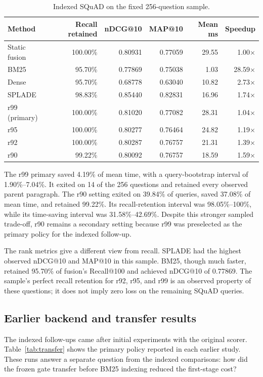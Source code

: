 \documentclass[conference]{IEEEtran}
\begin{document}
\begin{table}[t]
\centering
\caption{Indexed SQuAD on the fixed 256-question sample.}
\label{tab:squad}
\small
\begin{tabular}{lrrrrr}
\toprule
Method & Recall retained & nDCG@10 & MAP@10 & Mean ms & Speedup\\
\midrule
Static fusion & 100.00\% & 0.80931 & 0.77059 & 29.55 & 1.00$\times$\\
BM25 & 95.70\% & 0.77869 & 0.75038 & 1.03 & 28.59$\times$\\
Dense & 95.70\% & 0.68778 & 0.63040 & 10.82 & 2.73$\times$\\
SPLADE & 98.83\% & 0.85440 & 0.82831 & 16.96 & 1.74$\times$\\
r99 (primary) & 100.00\% & 0.81020 & 0.77082 & 28.31 & 1.04$\times$\\
r95 & 100.00\% & 0.80277 & 0.76464 & 24.82 & 1.19$\times$\\
r92 & 100.00\% & 0.80287 & 0.76757 & 21.31 & 1.39$\times$\\
r90 & 99.22\% & 0.80092 & 0.76757 & 18.59 & 1.59$\times$\\
\bottomrule
\end{tabular}
\end{table}

The r99 primary saved 4.19\% of mean time, with a query-bootstrap interval of 1.90\%--7.04\%. It exited on 14 of the 256 questions and retained every observed parent paragraph. The r90 setting exited on 39.84\% of queries, saved 37.08\% of mean time, and retained 99.22\%. Its recall-retention interval was 98.05\%--100\%, while its time-saving interval was 31.58\%--42.69\%. Despite this stronger sampled trade-off, r90 remains a secondary setting because r99 was preselected as the primary policy for the indexed follow-up.

The rank metrics give a different view from recall. SPLADE had the highest observed nDCG@10 and MAP@10 in this sample. BM25, though much faster, retained 95.70\% of fusion's Recall@100 and achieved nDCG@10 of 0.77869. The sample's perfect recall retention for r92, r95, and r99 is an observed property of these questions; it does not imply zero loss on the remaining SQuAD queries.

\subsection{Earlier backend and transfer results}
The indexed follow-ups came after initial experiments with the original scorer. Table~\ref{tab:transfer} shows the primary policy reported in each earlier study. These runs answer a separate question from the indexed comparisons: how did the frozen gate transfer before BM25 indexing reduced the first-stage cost?
\end{document}
